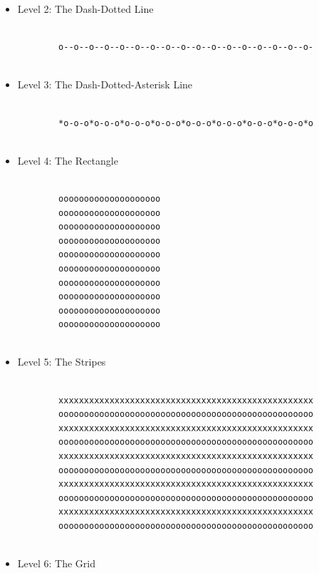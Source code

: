 \documentclass[12pt]{article}
\begin{document}
\begin{description}[labelindent=1cm]
\begin{itemize}
\begin{lstlisting}
		\end{lstlisting}
		
		\item Level 2: The Dash-Dotted Line
		
		\begin{lstlisting}
		
		o--o--o--o--o--o--o--o--o--o--o--o--o--o--o--o--o-
		
		\end{lstlisting}
		
		\item Level 3: The Dash-Dotted-Asterisk Line
		
		\begin{lstlisting}
		
		*o-o-o*o-o-o*o-o-o*o-o-o*o-o-o*o-o-o*o-o-o*o-o-o*o
		
		\end{lstlisting}
		
		\newpage
		\item Level 4: The Rectangle
		
		\begin{lstlisting}
		
		oooooooooooooooooooo
		oooooooooooooooooooo
		oooooooooooooooooooo
		oooooooooooooooooooo
		oooooooooooooooooooo
		oooooooooooooooooooo
		oooooooooooooooooooo
		oooooooooooooooooooo
		oooooooooooooooooooo
		oooooooooooooooooooo
		
		\end{lstlisting}
		
		\item Level 5: The Stripes
		
		\begin{lstlisting}
		
		xxxxxxxxxxxxxxxxxxxxxxxxxxxxxxxxxxxxxxxxxxxxxxxxxx
		oooooooooooooooooooooooooooooooooooooooooooooooooo
		xxxxxxxxxxxxxxxxxxxxxxxxxxxxxxxxxxxxxxxxxxxxxxxxxx
		oooooooooooooooooooooooooooooooooooooooooooooooooo
		xxxxxxxxxxxxxxxxxxxxxxxxxxxxxxxxxxxxxxxxxxxxxxxxxx
		oooooooooooooooooooooooooooooooooooooooooooooooooo
		xxxxxxxxxxxxxxxxxxxxxxxxxxxxxxxxxxxxxxxxxxxxxxxxxx
		oooooooooooooooooooooooooooooooooooooooooooooooooo
		xxxxxxxxxxxxxxxxxxxxxxxxxxxxxxxxxxxxxxxxxxxxxxxxxx
		oooooooooooooooooooooooooooooooooooooooooooooooooo
		
		\end{lstlisting}
		
	    \item Level 6: The Grid
		
		\begin{lstlisting}
		

\end{lstlisting}
\end{itemize}
\end{description}
\end{document}
